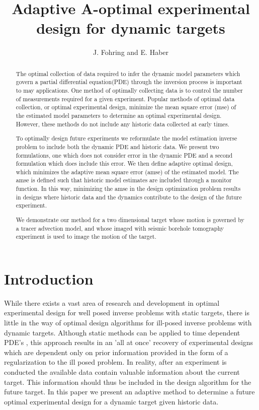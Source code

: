 \documentclass[english]{siamltex}
\begin{document}
\title{ Adaptive A-optimal experimental design for dynamic targets}
\author{J. Fohring and E. Haber }
\maketitle


\begin{abstract}
The optimal collection of data required to infer the dynamic model parameters which govern a partial differential equation(PDE) through the inversion process is important to may applications. 
One method of optimally collecting data is to control the number of measurements required for a given experiment. Popular methods of optimal data collection, or optimal experimental design, minimize the mean square error (mse)  of the estimated model parameters to determine an optimal experimental design. However, these methods do not include any historic data collected at early times. 

 To optimally design future experiments we reformulate the model estimation inverse problem to include both the dynamic PDE and historic data. We present two formulations, one which does not consider error in the dynamic PDE and a second formulation which does include this error. We then define  adaptive optimal design, which minimizes the adaptive  mean square error (amse) of the estimated model. The amse is defined such that historic model estimates are included through a monitor function. In this way, minimizing the amse in the design optimization problem results in designs where historic  data and the dynamics contribute to the design of the future experiment.

We demonstrate our method for a two dimensional target whose motion is governed by a tracer advection model, and whose imaged with seismic borehole tomography experiment is used to image the motion of the target.  
 


\end{abstract}


\section{Introduction}
 While there exists a vast area of research and development in optimal experimental design for well posed inverse problems with static targets, there is little in the way of optimal design algorithms for ill-posed inverse problems with dynamic targets. Although static methods can be applied to time dependent PDE's \cite{Alexanderian2014}, this approach results in an 'all at once' recovery of experimental designs which are dependent only on prior information provided in the form of a regularization to the ill posed problem. In reality, after an experiment is conducted the available data contain valuable information about the current target. This information should thus be included in the design algorithm for the future target. In this paper we present an adaptive method to determine a future optimal experimental design for a dynamic target given historic data.
 
\end{document}
